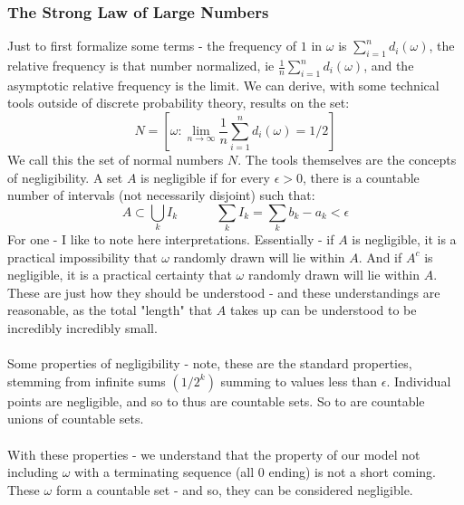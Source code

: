 \documentclass[12pt,a4paper]{article}
\newcommand{\1}[1]{\mathbbm{1}\left\{ #1 \right\}}
\begin{document}
\subsubsection{The Strong Law of Large Numbers}
Just to first formalize some terms - the frequency of $1$ in $\omega$ is $\sum_{i=1}^n d_i(\omega)$, the relative frequency is that number normalized, ie $\frac{1}{n} \sum_{i=1}^n d_i(\omega)$, and the asymptotic relative frequency is the limit. We can derive, with some technical tools outside of discrete probability theory, results on the set:
$$
	N = \left[\omega : \lim_{n \to \infty} \frac{1}{n} \sum_{i=1}^n d_i(\omega) = 1/2\right]
$$
We call this the set of normal numbers $N$. The tools themselves are the concepts of negligibility. A set $A$ is negligible if for every $\epsilon > 0$, there is a countable number of intervals (not necessarily disjoint) such that:
$$
	A \subset \bigcup_k I_k \quad\quad\quad \sum_k I_k = \sum_k b_k - a_k < \epsilon
$$
For one - I like to note here interpretations. Essentially - if $A$ is negligible, it is a practical impossibility that $\omega$ randomly drawn will lie within $A$. And if $A^c$ is negligible, it is a practical certainty that $\omega$ randomly drawn will lie within $A$. These are just how they should be understood - and these understandings are reasonable, as the total "length" that $A$ takes up can be understood to be incredibly incredibly small.
\\\\
Some properties of negligibility - note, these are the standard properties, stemming from infinite sums $(1/2^k)$ summing to values less than $\epsilon$. Individual points are negligible, and so to thus are countable sets. So to are countable unions of countable sets.
\\\\
With these properties - we understand that the property of our model not including $\omega$ with a terminating sequence (all $0$ ending) is not a short coming. These $\omega$ form a countable set - and so, they can be considered negligible.
\end{document}
